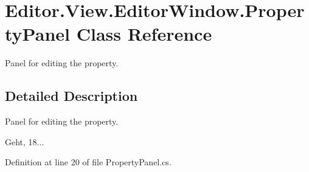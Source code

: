 \section{Editor.\-View.\-Editor\-Window.\-Property\-Panel Class Reference}
\label{class_editor_1_1_view_1_1_editor_window_1_1_property_panel}


Panel for editing the property.  




\subsection{Detailed Description}
Panel for editing the property. 

Geht, 18... 

Definition at line 20 of file Property\-Panel.\-cs.

